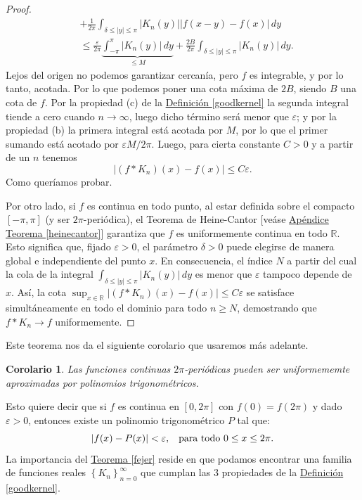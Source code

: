 \documentclass[12pt]{article}
\theoremstyle{plain}
\newtheorem{corolario}[teorema]{Corolario}
\theoremstyle{definition}
\numberwithin{equation}{section}
\begin{document}
\begin{proof}
\begin{align*}
                &+ \frac{1}{2\pi}\int_{\delta \leq |y| \leq \pi} \left\lvert K_n (y)\right\rvert \left\lvert f(x-y) - f(x)\right\rvert\,dy \\
                &\leq \frac{\varepsilon}{2\pi} \underbrace{\int_{-\pi}^{\pi} \left\lvert K_n (y) \right\rvert \,dy}_{\text{$\leq M$}}+ \frac{2B}{2\pi} \int_{\delta \leq |y| \leq \pi} \left\lvert K_n (y) \right\rvert\,dy.
            \end{align*}
            Lejos del origen no podemos garantizar cercanía, pero \(f\) es integrable, y por lo tanto, acotada. Por lo que podemos poner una cota máxima de \(2B\), siendo \(B\) una cota de \(f\).
            Por la propiedad (c) de la \hyperref[goodkernel]{Definición \ref*{goodkernel}} la segunda integral tiende a cero cuando \(n \to \infty\), luego dicho término será menor que \(\varepsilon\); y por la propiedad (b) la primera integral está acotada por \(M\), por lo que el primer sumando está acotado por \(\varepsilon M/2\pi\). Luego, para cierta constante \(C > 0\) y a partir de un \(n\) tenemos
            $$\left\lvert (f \ast K_n)(x) - f(x)\right\rvert \leq C \varepsilon.$$
            Como queríamos probar. 
            
            Por otro lado, si \(f\) es continua en todo punto, al estar definida sobre el compacto \([-\pi,\pi]\) (y ser \(2\pi\)-periódica), el Teorema de Heine-Cantor [veáse \hyperref[heinecantor]{Apéndice Teorema \ref*{heinecantor}}] garantiza que \(f\) es uniformemente continua en todo \(\mathbb{R}\). Esto significa que, fijado \(\varepsilon > 0\), el parámetro \(\delta > 0\) puede elegirse de manera global e independiente del punto \(x\). En consecuencia, el índice \(N\) a partir del cual la cola de la integral \(\int_{\delta \leq |y| \leq \pi} \lvert K_n(y) \rvert \,dy\) es menor que \(\varepsilon\) tampoco depende de \(x\). Así, la cota \(\sup_{x \in \mathbb{R}} \lvert (f \ast K_n)(x) - f(x) \rvert \leq C\varepsilon\) se satisface simultáneamente en todo el dominio para todo \(n \ge N\), demostrando que \(f \ast K_n \to f\) uniformemente.
        \end{proof}
        Este teorema nos da el siguiente corolario que usaremos más adelante.
        \begin{corolario}
                Las funciones continuas \(2\pi\)-periódicas pueden ser uniformememte aproximadas por polinomios trigonométricos.
            \end{corolario}
            Esto quiere decir que si \(f\) es continua en \([0,2\pi]\) con \(f(0) = f(2\pi)\) y dado \(\varepsilon > 0\), entonces existe un polinomio trigonométrico \(P\) tal que: $$\left\lvert f(x) - P(x)\right\rvert < \varepsilon, \hspace{3mm} \text{para todo \(0 \leq x \leq 2\pi\)}.$$
        La importancia del \hyperref[fejer]{Teorema \ref*{fejer}} reside en que podamos encontrar una familia de funciones reales \(\left\{K_n\right\}_{n=0}^{\infty} \) que cumplan las 3 propiedades de la \hyperref[goodkernel]{Definición \ref*{goodkernel}}.
\end{document}
